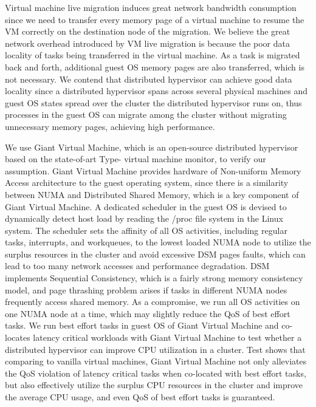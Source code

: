 \begin{bigabstract}
Virtual machine live migration induces great network bandwidth consumption since we need to transfer every memory page of a virtual machine to resume the VM correctly on the destination node of the migration. We believe the great network overhead introduced by VM live migration is because the poor data locality of tasks being transferred in the virtual machine. As a task is migrated back and forth, additional guest OS memory pages are also transferred, which is not necessary. We contend that distributed hypervisor can achieve good data locality since a distributed hypervisor spans across several physical machines and guest OS states spread over the cluster the distributed hypervisor runs on, thus processes in the guest OS can migrate among the cluster without migrating unnecessary memory pages, achieving high performance. 

We use Giant Virtual Machine, which is an open-source distributed hypervisor based on the state-of-art Type-\uppercase\expandafter{} virtual machine monitor, to verify our assumption. Giant Virtual Machine provides hardware of Non-uniform Memory Access architecture to the guest operating system, since there is a similarity between NUMA and Distributed Shared Memory, which is a key component of Giant Virtual Machine. A dedicated scheduler in the guest OS is devised to dynamically detect host load by reading the /proc file system in the Linux system. The scheduler sets the affinity of all OS activities, including regular tasks, interrupts, and workqueues, to the lowest loaded NUMA node to utilize the surplus resources in the cluster and avoid excessive DSM pages faults, which can lead to too many network accesses and performance degradation. DSM implements Sequential Consistency, which is a fairly strong memory consistency model, and page thrashing problem arises if tasks in different NUMA nodes frequently access shared memory. As a compromise, we run all OS activities on one NUMA node at a time, which may slightly reduce the QoS of best effort tasks. We run best effort tasks in guest OS of Giant Virtual Machine and co-locates latency critical workloads with Giant Virtual Machine to test whether a distributed hypervisor can improve CPU utilization in a cluster. Test shows that comparing to vanilla virtual machines, Giant Virtual Machine not only alleviates the QoS violation of latency critical tasks when co-located with best effort tasks, but also effectively utilize the surplus CPU resources in the cluster and improve the average CPU usage, and even QoS of best effort tasks is guaranteed.


\end{bigabstract}
